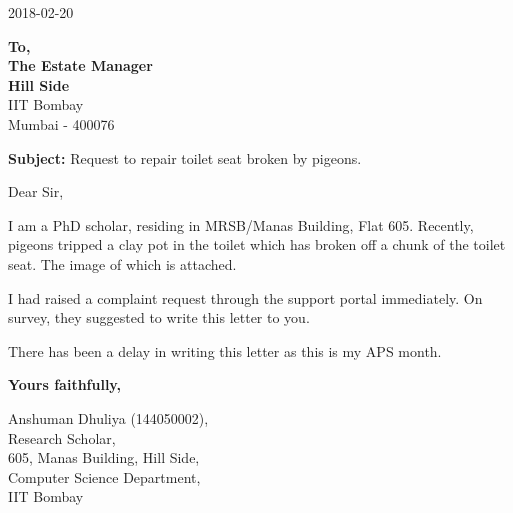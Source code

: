 \documentclass{article}
\begin{document}
\begin{center}
2018-02-20
\end{center}
\vspace{4ex}

\noindent\textbf{To,\\The Estate Manager\\Hill Side}\\IIT Bombay\\Mumbai - 400076
\vspace{4ex}

\noindent\textbf{Subject:} Request to repair toilet seat broken by pigeons.

\vspace{4ex}
\noindent{}Dear Sir,
\vspace{2ex}

\noindent{}I am a PhD scholar, residing in MRSB/Manas Building, Flat 605. Recently, pigeons tripped a clay pot in the toilet which has broken off a chunk of the toilet seat. The image of which is attached.
\vspace{2ex}

\noindent{}I had raised a complaint request through the support portal immediately. On survey, they suggested to write this letter to you.
\vspace{2ex}

\noindent{}There has been a delay in writing this letter as this is my APS month.
\vspace{2ex}

\vspace{8ex}
\noindent{}\textbf{Yours faithfully,}
\vspace{8ex}

\noindent{}Anshuman Dhuliya (144050002),\\
Research Scholar,\\
605, Manas Building, Hill Side,\\
Computer Science Department,\\
IIT Bombay
\end{document}

